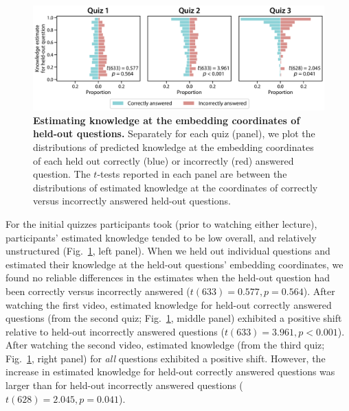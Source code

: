 \documentclass[10pt]{article}
\begin{document}
\begin{figure}[tp]
    \centering
    \includegraphics[width=\textwidth]{figs/held-out-question-analysis}

    \caption{\textbf{Estimating knowledge at the embedding coordinates of
    held-out questions.} Separately for each quiz (panel), we plot the
    distributions of predicted knowledge at the embedding coordinates of each
    held out correctly (blue) or incorrectly (red) answered question. The
    $t$-tests reported in each panel are between the distributions of estimated
    knowledge at the coordinates of correctly versus incorrectly answered
    held-out questions.}

    \label{fig:predictions}
\end{figure}

For the initial quizzes participants took (prior to watching either lecture),
participants' estimated knowledge tended to be low overall, and relatively
unstructured (Fig.~\ref{fig:predictions}, left panel). When we held out
individual questions and estimated their knowledge at the held-out questions'
embedding coordinates, we found no reliable differences in the estimates when
the held-out question had been correctly versus incorrectly answered ($t(633) =
0.577, p = 0.564$). After watching the first video, estimated knowledge for
held-out correctly answered questions (from the second quiz;
Fig.~\ref{fig:predictions}, middle panel) exhibited a positive shift relative
to held-out incorrectly answered questions ($t(633) = 3.961, p < 0.001$). After
watching the second video, estimated knowledge (from the third quiz;
Fig.~\ref{fig:predictions}, right panel) for \textit{all} questions exhibited a
positive shift. However, the increase in estimated knowledge for held-out
correctly answered questions was larger than for held-out incorrectly answered
questions ($t(628) = 2.045, p = 0.041$).
\end{document}
